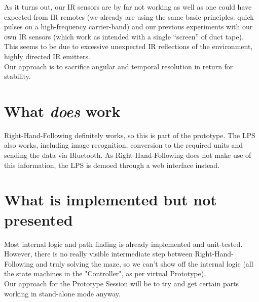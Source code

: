 \documentclass[a4paper,parskip,headheight=38pt]{scrartcl} %
\begin{document}
As it turns out, our IR sensors are by far not working as well as one
could have expected from IR remotes (we already are using the same
basic principles: quick pulses on a high-frequency carrier-band) and
our previous experiments with our own IR sensors (which work as
intended with a single \enquote{screen} of duct tape).
 \\
This seems to be due to excessive unexpected IR reflections of the
environment, highly directed IR emitters.
 \\
Our approach is to sacrifice angular and temporal resolution in return
for stability.

\section{What \emph{does} work}

Right-Hand-Following definitely works, so this is part of the
prototype.  The LPS also works, including image recognition, conversion
to the required units and sending the data via Bluetooth.  As
Right-Hand-Following does not make use of this information, the LPS is
demoed through a web interface instead.

\section{What is implemented but not presented}

Most internal logic and path finding is already implemented and
unit-tested.  However, there is no really visible intermediate step
between Right-Hand-Following and truly solving the maze, so we can't
show off the internal logic (all the state machines in the
"Controller", as per virtual Prototype).
 \\
Our approach for the Prototype Session will be to try and get certain
parts working in stand-alone mode anyway.
\end{document}
